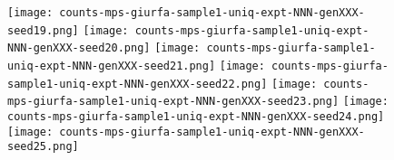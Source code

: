 \documentclass[12pt]{article}
\begin{document}
\begin{figure}
  \texttt{[image: counts-mps-giurfa-sample1-uniq-expt-NNN-genXXX-seed19.png]}\hspace{-7mm}
  \texttt{[image: counts-mps-giurfa-sample1-uniq-expt-NNN-genXXX-seed20.png]}
%
  \texttt{[image: counts-mps-giurfa-sample1-uniq-expt-NNN-genXXX-seed21.png]}\hspace{-7mm}
  \texttt{[image: counts-mps-giurfa-sample1-uniq-expt-NNN-genXXX-seed22.png]}\hspace{-7mm}
  \texttt{[image: counts-mps-giurfa-sample1-uniq-expt-NNN-genXXX-seed23.png]}\hspace{-7mm}
  \texttt{[image: counts-mps-giurfa-sample1-uniq-expt-NNN-genXXX-seed24.png]}\hspace{-7mm}
  \texttt{[image: counts-mps-giurfa-sample1-uniq-expt-NNN-genXXX-seed25.png]}
%
\end{figure}
\end{document}
